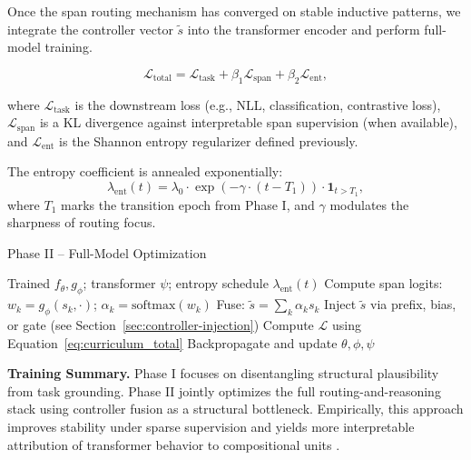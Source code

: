 Once the span routing mechanism has converged on stable inductive patterns, we integrate the controller vector \(\tilde{s}\) into the transformer encoder and perform full-model training.

\begin{equation}
\mathcal{L}_{\mathrm{total}} = \mathcal{L}_{\mathrm{task}} + \beta_1 \mathcal{L}_{\mathrm{span}} + \beta_2 \mathcal{L}_{\mathrm{ent}},
\label{eq:curriculum_total}
\end{equation}

where \(\mathcal{L}_{\mathrm{task}}\) is the downstream loss (e.g., NLL, classification, contrastive loss), \(\mathcal{L}_{\mathrm{span}}\) is a KL divergence against interpretable span supervision (when available), and \(\mathcal{L}_{\mathrm{ent}}\) is the Shannon entropy regularizer defined previously.

The entropy coefficient is annealed exponentially:
\begin{equation}
\lambda_{\mathrm{ent}}(t) = \lambda_0 \cdot \exp(-\gamma \cdot (t - T_1)) \cdot \mathbf{1}_{t > T_1},
\label{eq:entropy_schedule}
\end{equation}
where \(T_1\) marks the transition epoch from Phase I, and \(\gamma\) modulates the sharpness of routing focus.

\begin{algorithm}[H]
\caption{Phase II – Full-Model Optimization}
\label{alg:e2e_finetuning}
\begin{algorithmic}[1]
\REQUIRE Trained \(f_\theta, g_\phi\); transformer \(\psi\); entropy schedule \(\lambda_{\mathrm{ent}}(t)\)
    \STATE Compute span logits: \(w_k = g_\phi(s_k, \cdot)\); \(\alpha_k = \mathrm{softmax}(w_k)\)
    \STATE Fuse: \(\tilde{s} = \sum_k \alpha_k s_k\)
    \STATE Inject \(\tilde{s}\) via prefix, bias, or gate (see Section~\ref{sec:controller-injection})
    \STATE Compute \(\mathcal{L}\) using Equation~\eqref{eq:curriculum_total}
    \STATE Backpropagate and update \(\theta, \phi, \psi\)
  \ENDFOR
\ENDFOR
\end{algorithmic}
\end{algorithm}

\vspace{0.5em}
\noindent\textbf{Training Summary.} Phase I focuses on disentangling structural plausibility from task grounding. Phase II jointly optimizes the full routing-and-reasoning stack using controller fusion as a structural bottleneck. Empirically, this approach improves stability under sparse supervision and yields more interpretable attribution of transformer behavior to compositional units \cite{belinkov2022probing}.

